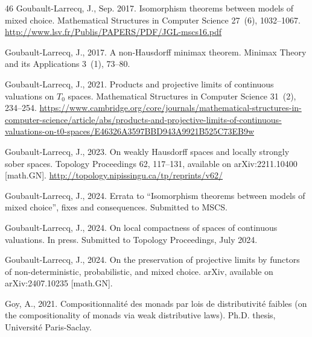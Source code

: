\documentclass[preprint,12pt]{elsarticle}
\begin{document}
\begin{thebibliography}{46}
Goubault{-}Larrecq, J., Sep. 2017{}. Isomorphism theorems between
  models of mixed choice. Mathematical Structures in Computer Science 27~(6),
  1032--1067.
\newline\urlprefix\url{http://www.lsv.fr/Publis/PAPERS/PDF/JGL-mscs16.pdf}

Goubault{-}Larrecq, J., 2017{}. A non-{H}ausdorff minimax theorem.
  Minimax Theory and its Applications 3~(1), 73--80.

Goubault-Larrecq, J., 2021. Products and projective limits of continuous
  valuations on {$T_0$} spaces. Mathematical Structures in Computer Science
  31~(2), 234--254.
\newline\urlprefix\url{https://www.cambridge.org/core/journals/mathematical-structures-in-computer-science/article/abs/products-and-projective-limits-of-continuous-valuations-on-t0-spaces/E46326A3597BBD943A9921B525C73EB9w}

Goubault-Larrecq, J., 2023. On weakly {H}ausdorff spaces and locally strongly
  sober spaces. Topology Proceedings 62, 117--131, available on
  arXiv:2211.10400 [math.GN].
\newline\urlprefix\url{http://topology.nipissingu.ca/tp/reprints/v62/}

Goubault-Larrecq, J., 2024{}. Errata to ``{I}somorphism theorems
  between models of mixed choice'', fixes and consequences. Submitted to MSCS.

Goubault-Larrecq, J., 2024{}. On local compactness of spaces of
  continuous valuations. In press. Submitted to Topology Proceedings, July
  2024.

Goubault-Larrecq, J., 2024{}. On the preservation of projective
  limits by functors of non-deterministic, probabilistic, and mixed choice.
  arXiv, available on arXiv:2407.10235 [math.GN].

Goy, A., 2021. Compositionnalit{\'e} des monads par lois de distributivit{\'e}
  faibles (on the compositionality of monads via weak distributive laws). Ph.D.
  thesis, Universit{\'e} Paris-Saclay.


\end{thebibliography}
\end{document}
